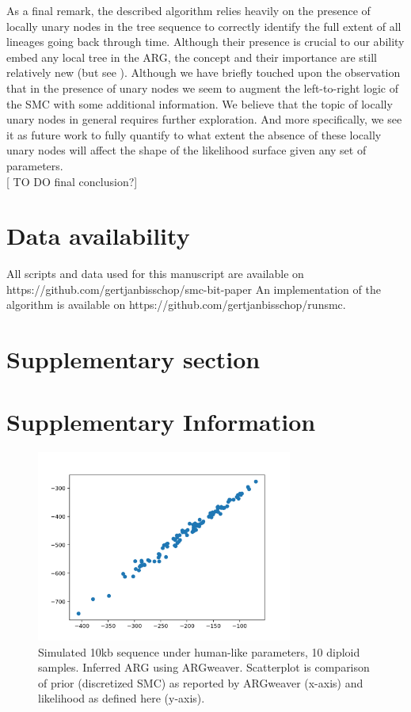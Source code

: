 \documentclass{article}
\newcommand{\supplementarysection}{%
  \setcounter{figure}{0}%
  \let\oldthefigure\thefigure%
  \renewcommand{\thefigure}{S\oldthefigure}%
  \section{Supplementary section}%
}
\begin{document}
As a final remark, the described algorithm relies heavily on the presence of locally unary 
nodes in the tree sequence to correctly identify the full extent of all lineages going back 
through time. Although their presence is crucial to our ability embed any local tree in the 
ARG, the concept and their importance are still relatively new (but see 
\citet{Wong-2023}). Although we have briefly touched upon the observation that in 
the presence of unary nodes we seem to augment the left-to-right logic of the SMC 
with some additional information. 
We believe that the topic of locally unary nodes in general requires further exploration. 
And more specifically, we see it as future work to fully quantify to what extent the 
absence of these locally unary nodes will affect the shape of the likelihood surface given 
any set of parameters.\\

[ TO DO final conclusion?]


\section{Data availability}

All scripts and data used for this manuscript are available on https://github.com/gertjanbisschop/smc-bit-paper
An implementation of the algorithm is available on https://github.com/gertjanbisschop/runsmc.
\FloatBarrier



\pagebreak 

\supplementarysection
\section*{Supplementary Information}


\begin{figure}[!ht]
\centering
\includegraphics[width=0.75\textwidth]{figures/supplementary-figs/argweaver_vs_runsmc.png}
\caption{Simulated 10kb sequence under human-like parameters, 10 diploid samples. Inferred ARG using ARGweaver. Scatterplot is comparison of prior (discretized SMC) as reported by ARGweaver (x-axis) and likelihood as defined here (y-axis).}
 \label{sup:fig:vs-argweaver}
\end{figure}
\end{document}
